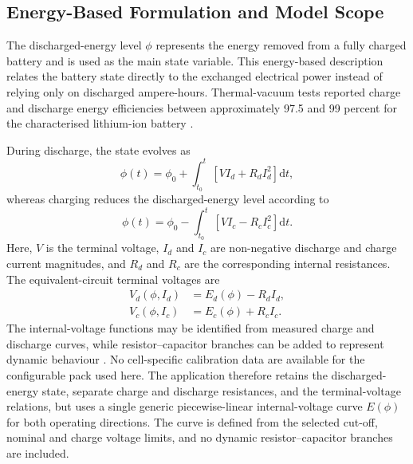 \subsection{Energy-Based Formulation and Model Scope}
\label{subsec:battery_theoretical_basis}

The discharged-energy level $\phi$ represents the energy removed from a fully
charged battery and is used as the main state variable. This energy-based
description relates the battery state directly to the exchanged electrical
power instead of relying only on discharged ampere-hours. Thermal-vacuum tests
reported charge and discharge energy efficiencies between approximately
97.5 and 99 percent for the characterised lithium-ion battery
\cite{porras2018battery}.

During discharge, the state evolves as
\begin{equation}
    \phi(t)
    =
    \phi_0
    +
    \int_{t_0}^{t}
    \left[V I_d+R_d I_d^2\right]\mathrm{d}t,
    \label{eq:battery_discharge_energy_ch8}
\end{equation}
whereas charging reduces the discharged-energy level according to
\begin{equation}
    \phi(t)
    =
    \phi_0
    -
    \int_{t_0}^{t}
    \left[V I_c-R_c I_c^2\right]\mathrm{d}t.
    \label{eq:battery_charge_energy_ch8}
\end{equation}
Here, $V$ is the terminal voltage, $I_d$ and $I_c$ are non-negative
discharge and charge current magnitudes, and $R_d$ and $R_c$ are the
corresponding internal resistances. The equivalent-circuit terminal voltages
are
\begin{align}
    V_d(\phi,I_d)
    &=
    E_d(\phi)-R_d I_d,
    \label{eq:battery_discharge_voltage_ch8}
    \\
    V_c(\phi,I_c)
    &=
    E_c(\phi)+R_c I_c.
    \label{eq:battery_charge_voltage_ch8}
\end{align}
The internal-voltage functions may be identified from measured charge and
discharge curves, while resistor--capacitor branches can be added to represent
dynamic behaviour \cite{porras2018battery}. No cell-specific calibration data
are available for the configurable pack used here. The application therefore
retains the discharged-energy state, separate charge and discharge
resistances, and the terminal-voltage relations, but uses a single generic
piecewise-linear internal-voltage curve $E(\phi)$ for both operating
directions. The curve is defined from the selected cut-off, nominal and charge
voltage limits, and no dynamic resistor--capacitor branches are included.

